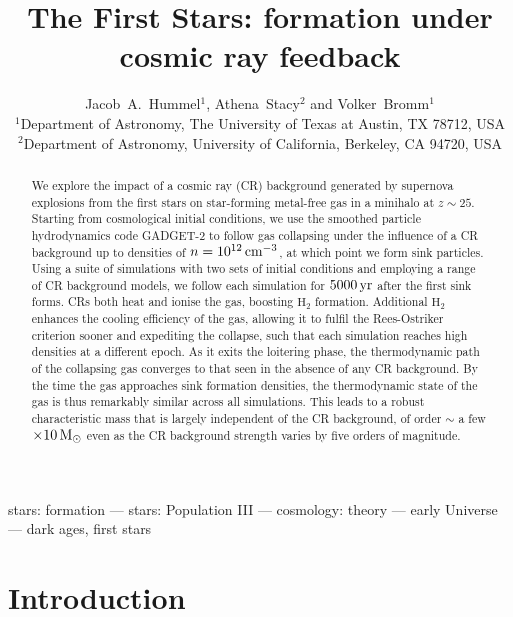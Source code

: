 \documentclass[usenatbib]{mn2e}
\title[First stars under cosmic ray feedback]{The First Stars: formation under cosmic ray feedback}
\author[J.A.~Hummel et al.]{Jacob~A.~Hummel$^{1}$, Athena~Stacy$^{2}$ and Volker~Bromm$^{1}$\\
$^1$Department of Astronomy, The University of Texas at Austin, TX 78712, USA\\
$^2$Department of Astronomy, University of California, Berkeley, CA 94720, USA}
\newcommand{\cc}{\,{\rm cm}^{-3}}
\newcommand{\msun}{\,{\rm M}_{\odot}}
\newcommand{\yr}{\,{\rm yr}}
\newcommand{\htwo}{\mathrm{H}_2}
\begin{document}


\maketitle

\begin{abstract}
We explore the impact of a cosmic ray (CR) background generated by supernova explosions from the first stars on star-forming metal-free gas in a minihalo at $z\sim25$.  
Starting from cosmological initial conditions, we use the smoothed particle hydrodynamics code GADGET-2 to follow gas collapsing under the influence of a CR background up to densities of $n=10^{12}\cc$, at which point we form sink particles. 
Using a suite of simulations with two sets of initial conditions and employing a range of CR background models, we follow each simulation for $5000\yr$ after the first sink forms.  
CRs both heat and ionise the gas, boosting $\htwo$ formation.  
Additional $\htwo$ enhances the cooling efficiency of the gas, allowing it to fulfil the Rees-Ostriker criterion sooner and expediting the collapse, such that each simulation reaches high densities at a different epoch. 
As it exits the loitering phase, the thermodynamic path of the collapsing gas converges to that seen in the absence of any CR background. 
By the time the gas approaches sink formation densities, the thermodynamic state of the gas is thus remarkably similar across all simulations. 
This leads to a robust characteristic mass that is largely independent of the CR background, of order $\sim$ a few $\times10\msun$ even as the CR background strength varies by five orders of magnitude.
\end{abstract}







\begin{keywords}
stars: formation --- stars: Population III --- cosmology: theory --- early Universe --- dark ages, first stars
\end{keywords}

\section{Introduction}
\label{intro}
\end{document}
